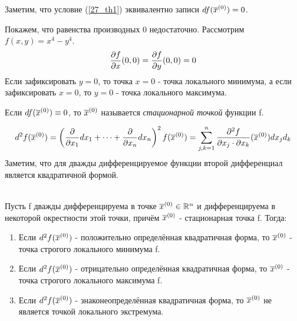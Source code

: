 \begin{note}
	Заметим, что условие (\ref{27_th1}) эквивалентно записи $df(\overline x^{({0})})=0$.
\end{note}
\begin{example}
	Покажем, что равенства производных 0 недостаточно. Рассмотрим $f(x,y)=x^4-y^4$.\\
	\[\frac{\partial f}{\partial x}(0,0)=\frac{\partial f}{\partial y}(0,0)=0\]
	Если зафиксировать $y=0$, то точка $x=0$ - точка локального минимума, а если зафиксировать $x=0$, то $y=0$ - точка локального максимума.
\end{example}
\begin{definition}
	Если $df(\overline x^{({0})})\equiv0$, то $\overline x^{({0})}$ называется \textit{стационарной точкой} функции f.
\end{definition}
\begin{note}
	\[d^2f(\vx\n)=\l( \frac\vd{\vd x_1}dx_1+\dots+\frac\vd{\vd x_n}dx_n \r)^2f(\vx\n)=\sum_{j,k=1}^n\frac{\vd^2f}{\vd x_j\cdot\vd x_k}(\vx\n)dx_jd_k\]
	Заметим, что для дважды дифференцируемое функции второй дифференциал является квадратичной формой.
\end{note}
\begin{theorem}\label{27_th2}\\
	Пусть f дважды дифференцируема в точке $\overline x^{({0})}\in\mathbb{R}^n$ и дифференцируема в некоторой окрестности этой точки, причём $\overline x^{({0})}$ - стационарная точка f. Тогда:
	\begin{enumerate}
		\item Если $d^2f(\overline x^{({0})})$ - положительно определённая квадратичная форма, то $\overline x^{({0})}$ - точка строгого локального минимума f.
		\item Если $d^2f(\overline x^{({0})})$ - отрицательно определённая квадратичная форма, то $\overline x^{({0})}$ - точка строгого локального максимума f.
		\item Если $d^2f(\overline x^{({0})})$ - знаконеопределённая квадратичная форма, то $\overline x^{({0})}$ не является точкой локального экстремума.
	\end{enumerate}
\end{theorem}
